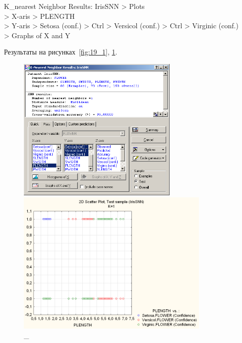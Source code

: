 \newpage

K\_nearest Neighbor Results: IrisSNN > Plots \\
> X-aris > PLENGTH \\
> Y-aris > Setosa (conf.) > Ctrl > Versicol (conf.) > Ctrl > Virginic (conf.) \\
> Graphs of X and Y

Результаты на рисунках~\ref{fig:19_1}, \ref{fig:20_1}.

\begin{figure}[!h]
  \centering

  \begin{minipage}{0.49\textwidth}
    \centering

    \includegraphics[height=7cm]
    {inc/ex_22.PNG}

    \caption{\_}

    \label{fig:19_1}
  \end{minipage}
  \begin{minipage}{0.49\textwidth}
    \centering

    \includegraphics[height=7cm]
    {inc/ex_23.PNG}

    \caption{\_}

    \label{fig:20_1}
  \end{minipage}
\end{figure}

